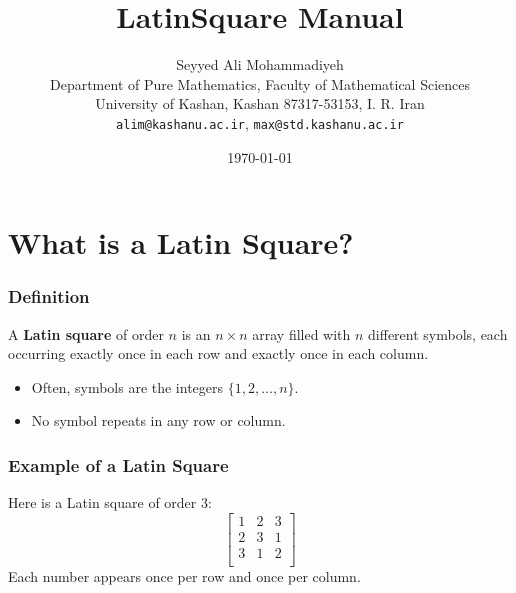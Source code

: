 \documentclass{beamer}
\title{LatinSquare Manual}
\author[S. A. Mohammadiyeh]{Seyyed Ali Mohammadiyeh\\
Department of Pure Mathematics, Faculty of Mathematical Sciences\\
University of Kashan, Kashan 87317-53153, I. R. Iran\\
\texttt{alim@kashanu.ac.ir}, \texttt{max@std.kashanu.ac.ir}}
\date{\today}
\begin{document}
\begin{frame}
  \titlepage
\end{frame}


\section{What is a Latin Square?}

\begin{frame}
\frametitle{Definition}
A \textbf{Latin square} of order $n$ is an $n \times n$ array filled with $n$ different symbols, each occurring exactly once in each row and exactly once in each column.
\pause
\begin{itemize}
  \item Often, symbols are the integers $\{1, 2, \dots, n\}$.
  \item No symbol repeats in any row or column.
\end{itemize}
\end{frame}

\begin{frame}
\frametitle{Example of a Latin Square}
Here is a Latin square of order 3:
\[
\begin{bmatrix}
1 & 2 & 3 \\
2 & 3 & 1 \\
3 & 1 & 2 \\
\end{bmatrix}
\]
\pause
Each number appears once per row and once per column.
\end{frame}

\end{document}
